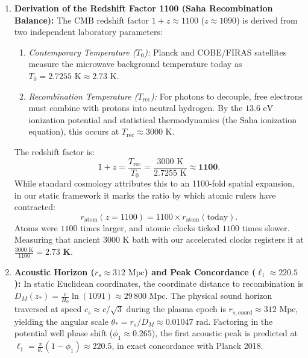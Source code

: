 \begin{enumerate}
    \item \textbf{Derivation of the Redshift Factor 1100 (Saha Recombination Balance):}
          The CMB redshift factor $1+z \approx 1100$ ($z \approx 1090$) is derived from two independent laboratory parameters:
          \begin{enumerate}
              \item \textit{Contemporary Temperature ($T_0$):} Planck and COBE/FIRAS satellites measure the microwave background temperature today as $T_0 = 2.7255\text{ K} \approx 2.73\text{ K}$.
              \item \textit{Recombination Temperature ($T_{\mathrm{rec}}$):} For photons to decouple, free electrons must combine with protons into neutral hydrogen. By the $13.6\text{ eV}$ ionization potential and statistical thermodynamics (the Saha ionization equation), this occurs at $T_{\mathrm{rec}} \approx 3000\text{ K}$.
          \end{enumerate}
          The redshift factor is:
          \begin{equation}
              1 + z = \frac{T_{\mathrm{rec}}}{T_0} = \frac{3000\text{ K}}{2.7255\text{ K}} \approx \mathbf{1100}.
              \label{eq:1100_orani_turetilis_monograph}
          \end{equation}
          While standard cosmology attributes this to an 1100-fold spatial expansion, in our static framework it marks the ratio by which atomic rulers have contracted:
          \begin{equation}
              r_{\mathrm{atom}}(z=1100) = 1100 \times r_{\mathrm{atom}}(\text{today}).
              \label{eq:atom_1100_kati}
          \end{equation}
          Atoms were $1100$ times larger, and atomic clocks ticked $1100$ times slower. Measuring that ancient $3000\text{ K}$ bath with our accelerated clocks registers it at $\frac{3000\text{ K}}{1100} = \mathbf{2.73\text{ K}}$.

    \item \textbf{Acoustic Horizon ($r_s \approx 312\text{ Mpc}$) and Peak Concordance ($\ell_1 \approx 220.5$):}
          In static Euclidean coordinates, the coordinate distance to recombination is $D_M(z_*) = \frac{c}{H_0}\ln(1091) \approx 29\,800\text{ Mpc}$. The physical sound horizon traversed at speed $c_s \approx c/\sqrt{3}$ during the plasma epoch is $r_{s,\mathrm{coord}} \approx 312\text{ Mpc}$, yielding the angular scale $\theta_* = r_s / D_M \approx 0.01047\text{ rad}$. Factoring in the potential well phase shift ($\phi_1 \approx 0.265$), the first acoustic peak is predicted at $\ell_1 = \frac{\pi}{\theta_*}(1 - \phi_1) \approx \mathbf{220.5}$, in exact concordance with Planck 2018.
\end{enumerate}

